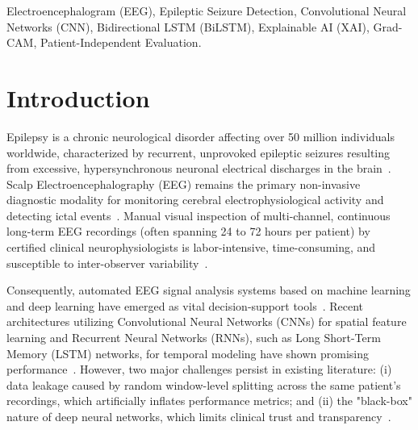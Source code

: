 \documentclass[conference]{IEEEtran}
\begin{document}
\begin{IEEEkeywords}
Electroencephalogram (EEG), Epileptic Seizure Detection, Convolutional Neural Networks (CNN), Bidirectional LSTM (BiLSTM), Explainable AI (XAI), Grad-CAM, Patient-Independent Evaluation.
\end{IEEEkeywords}

\section{Introduction}
Epilepsy is a chronic neurological disorder affecting over 50 million individuals worldwide, characterized by recurrent, unprovoked epileptic seizures resulting from excessive, hypersynchronous neuronal electrical discharges in the brain~\cite{goldberger2000physiobank, shoeibi2021epileptic}. Scalp Electroencephalography (EEG) remains the primary non-invasive diagnostic modality for monitoring cerebral electrophysiological activity and detecting ictal events~\cite{truong2019generalized}. Manual visual inspection of multi-channel, continuous long-term EEG recordings (often spanning 24 to 72 hours per patient) by certified clinical neurophysiologists is labor-intensive, time-consuming, and susceptible to inter-observer variability~\cite{khan2021focal}.

Consequently, automated EEG signal analysis systems based on machine learning and deep learning have emerged as vital decision-support tools~\cite{tiwari2021bilstm}. Recent architectures utilizing Convolutional Neural Networks (CNNs) for spatial feature learning and Recurrent Neural Networks (RNNs), such as Long Short-Term Memory (LSTM) networks, for temporal modeling have shown promising performance~\cite{acharya2018deep, ullah2018automated}. However, two major challenges persist in existing literature: (i) data leakage caused by random window-level splitting across the same patient's recordings, which artificially inflates performance metrics; and (ii) the "black-box" nature of deep neural networks, which limits clinical trust and transparency~\cite{selvaraju2017grad, covert2022explaining}.
\end{document}
